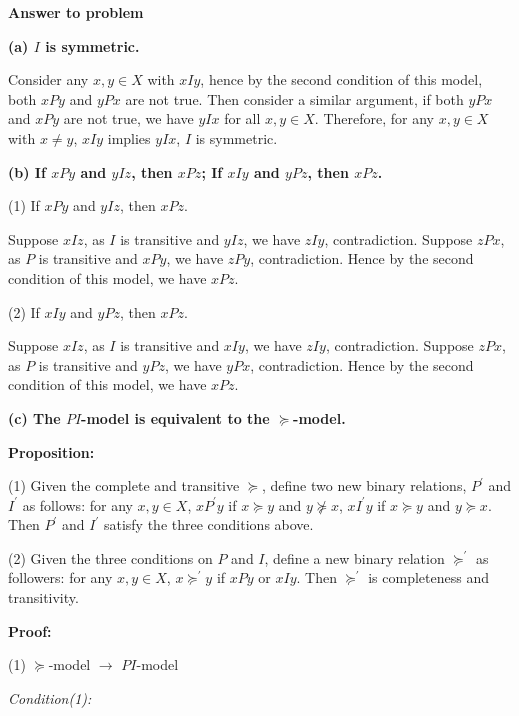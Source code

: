 \documentclass[12pt, a4paper, oneside]{article}
\newcounter{answername}
\newenvironment{answer}{\stepcounter{answername}\par\noindent\textbf{Answer to problem \arabic{answername}\newline}}{\\\par}
\begin{document}
\begin{answer}

\noindent\textbf{(a) $I$ is symmetric.}

Consider any $x, y \in X$ with $xIy$, hence by the second condition of this model, both $xPy$ and $yPx$ are not true. 
Then consider a similar argument, if both $yPx$ and $xPy$ are not true, we have $yIx$ for all $x, y \in X$. 
Therefore, for any $x, y \in X$ with $x \neq y$, $xIy$ implies $yIx$, $I$ is symmetric.
\newline

\noindent\textbf{(b) If $xPy$ and $yIz$, then $xPz$; If $xIy$ and $yPz$, then $xPz$.}

(1) If $xPy$ and $yIz$, then $xPz$.

Suppose $xIz$, as $I$ is transitive and $yIz$, we have $zIy$, contradiction.
Suppose $zPx$, as $P$ is transitive and $xPy$, we have $zPy$, contradiction. 
Hence by the second condition of this model, we have $xPz$.

(2) If $xIy$ and $yPz$, then $xPz$.

Suppose $xIz$, as $I$ is transitive and $xIy$, we have $zIy$, contradiction.
Suppose $zPx$, as $P$ is transitive and $yPz$, we have $yPx$, contradiction.
Hence by the second condition of this model, we have $xPz$.
\newline

\noindent\textbf{(c) The $PI$-model is equivalent to the $\succeq$-model.}
\newline

\noindent\textbf{Proposition:}

\noindent(1) Given the complete and transitive $\succeq$, define two new binary relations, $P^\prime$ and $I^\prime$ as follows: for any $x, y \in X$, $ xP^\prime y$ if $x\succeq y$ and $y \nsucceq x$, $xI^\prime y$ if $x\succeq y$ and $y\succeq x$. Then $P^\prime$ and $I^\prime$ satisfy the three conditions above.

\noindent(2) Given the three conditions on $P$ and $I$, define a new binary relation $\succeq^\prime$ as followers: for any $x, y \in X$, $x\succeq^\prime y$ if $xPy$ or $xIy$. Then $\succeq^\prime$ is completeness and transitivity.
\newline

\noindent\textbf{Proof:}

\noindent(1) $\succeq$-model $\rightarrow$ $PI$-model
\newline

\noindent \textit{Condition(1):}


\end{answer}
\end{document}
